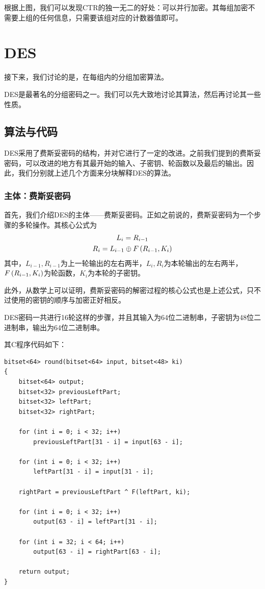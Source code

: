 根据上图，我们可以发现CTR的独一无二的好处：可以并行加密。其每组加密不需要上组的任何信息，只需要该组对应的计数器值即可。
\section{DES}
接下来，我们讨论的是，在每组内的分组加密算法。\par
DES是最著名的分组密码之一。我们可以先大致地讨论其算法，然后再讨论其一些性质。
\subsection{算法与代码}
DES采用了费斯妥密码的结构，并对它进行了一定的改进。之前我们提到的费斯妥密码，可以改进的地方有其最开始的输入、子密钥、轮函数以及最后的输出。因此，我们分别就上述几个方面来分块解释DES的算法。
\subsubsection{主体：费斯妥密码}
首先，我们介绍DES的主体——费斯妥密码。正如之前说的，费斯妥密码为一个步骤的多轮操作。其核心公式为
\begin{gather}
    L_{i}=R_{i-1}\\
    R_{i}=L_{i-1}\oplus F\left( {R_{i-1}, K_i}\right)
\end{gather}
其中，$L_{i-1}, R_{i-1}$为上一轮输出的左右两半，$L_i, R_i$为本轮输出的左右两半，$F\left( {R_{i-1}, K_i}\right)$为轮函数，$K_i$为本轮的子密钥。\par
此外，从数学上可以证明，费斯妥密码的解密过程的核心公式也是上述公式，只不过使用的密钥的顺序与加密正好相反。\par
DES密码一共进行16轮这样的步骤，并且其输入为64位二进制串，子密钥为48位二进制串，输出为64位二进制串。\par
其C程序代码如下：
\begin{prove}
\begin{verbatim}
bitset<64> round(bitset<64> input, bitset<48> ki)
{
    bitset<64> output;
    bitset<32> previousLeftPart;
    bitset<32> leftPart;
    bitset<32> rightPart;
    
    for (int i = 0; i < 32; i++)
        previousLeftPart[31 - i] = input[63 - i];
    
    for (int i = 0; i < 32; i++)
        leftPart[31 - i] = input[31 - i];
    
    rightPart = previousLeftPart ^ F(leftPart, ki);
    
    for (int i = 0; i < 32; i++)
        output[63 - i] = leftPart[31 - i];
    
    for (int i = 32; i < 64; i++)
        output[63 - i] = rightPart[63 - i];

    return output;
}
\end{verbatim}
\end{prove}

